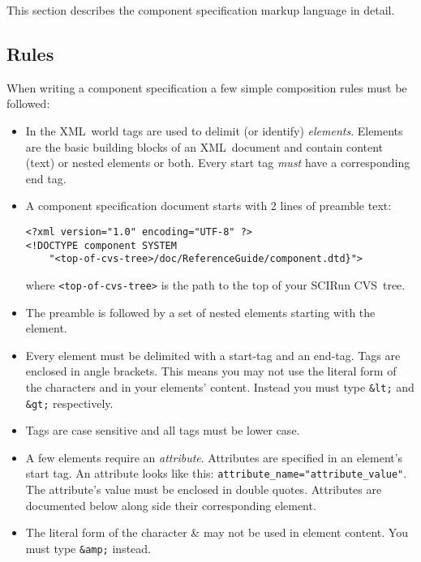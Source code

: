 \documentclass{article}
\newcommand{\ab}[1]{\latexhtml{$<$#1$>$}{<#1>}}
\newcommand{\la}{\latexhtml{$<$}{<}}
\newcommand{\ra}{\latexhtml{$>$}{>}}
\newcommand{\acronym}[1]{#1}
\newcommand{\dfn}[1]{\emph{#1}}
\newcommand{\filename}[1]{\texttt{#1}}
\newcommand{\xml}{\acronym{XML}}
\newcommand{\cvs}{\acronym{CVS}}
\newcommand{\element}[1]{\ab{\texttt{#1}}}
\newcommand{\keyboard}[1]{\texttt{#1}}
\newcommand{\icode}[1]{\texttt{#1}}
\newcommand{\SUBSECrules}{Rules}
\begin{document}
This section describes the component specification markup language in
detail.

\subsection{\SUBSECrules}
\label{\SUBSECrules}

When writing a component specification a few simple composition rules
must be followed:

\begin{itemize}
\item In the \xml\ world tags are used to delimit (or identify)
  \dfn{elements}.  Elements are the basic building blocks of an \xml\ 
  document and contain content (text) or nested elements or both.  Every
  start tag \emph{must} have a corresponding end tag.
  
\item A component specification document starts with 2 lines of preamble
  text:

\begin{verbatim}
<?xml version="1.0" encoding="UTF-8" ?>
<!DOCTYPE component SYSTEM 
    "<top-of-cvs-tree>/doc/ReferenceGuide/component.dtd}">
\end{verbatim}

where \filename{<top-of-cvs-tree>} is the path to the top of your SCIRun \cvs\
tree. 
  
\item The preamble is followed by a set of nested elements starting with
  the \element{component} element.
  
\item Every element must be delimited with a start-tag and an end-tag.
  Tags are enclosed in angle brackets.  This means you may not use the
  literal form of the characters \keyboard{\la} and \keyboard{\ra} in your
  elements' content.  Instead you must type \keyboard{\&lt;} and
  \keyboard{\&gt;} respectively.

\item Tags are case sensitive and all tags must be lower case.
  
\item A few elements require an \dfn{attribute}.  Attributes are specified
  in an element's start tag.  An attribute looks like this:
  \icode{attribute\_name="attribute\_value"}.  The attribute's value must be
  enclosed in double quotes. Attributes are documented below along side
  their corresponding element.
  
\item The literal form of the character \& may not be used in element
  content.  You must type \keyboard{\&amp;} instead.

\end{itemize}
\end{document}
